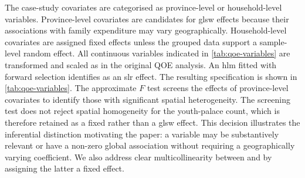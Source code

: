 \documentclass[times]{interact}
\theoremstyle{plain}%
\theoremstyle{definition}
\theoremstyle{remark}
\begin{document}

The case-study covariates are categorised as province-level or household-level variables.
Province-level covariates are candidates for \gls{glsw} effects because their associations with family expenditure may vary geographically.
Household-level covariates are assigned fixed effects unless the grouped data support a sample-level random effect.
All continuous variables indicated in \autoref{tab:qoe-variables} are transformed and scaled as in the original QOE analysis.
An \gls{hlm} fitted with forward selection identifies \RegionUrban as an \gls{slr} effect.
The resulting specification is shown in \autoref{tab:qoe-variables}.
The approximate $F$ test screens the effects of province-level covariates to identify those with significant spatial heterogeneity.
The screening test does not reject spatial homogeneity for the youth-palace count, which is therefore retained as a fixed rather than a \gls{glsw} effect.
This decision illustrates the inferential distinction motivating the paper: a variable may be substantively relevant or have a non-zero global association without requiring a geographically varying coefficient.
We also address clear multicollinearity between \GDPPrimary and \NumEnterprise by assigning the latter a fixed effect.
\end{document}
